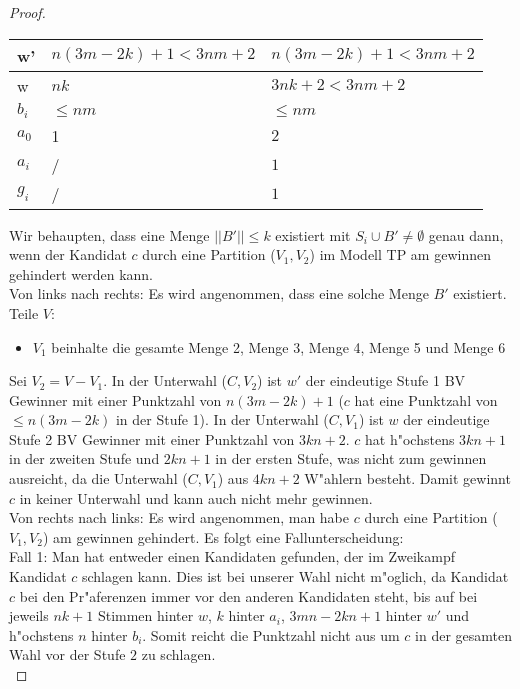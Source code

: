 \documentclass[11pt, a4paper, twoside]{article}
\begin{document}
\begin{proof}
\begin{minipage}{\textwidth}{}
\begin{tabular}{|lll|}
\hline
w'&$n(3m-2k)+1<3nm+2$& $n(3m-2k)+1<3nm+2$\\
\hline
w&$nk$&$3nk+2<3nm+2$\\
\hline
$b_i$&$\leq nm$&$\leq nm$\\
\hline
$a_0$&1& $2$\\
\hline
$a_i$&/& $1$\\
\hline
$g_i$&/& $1$\\
\hline
\end{tabular}
\end{minipage}
\newline
\newline
Wir behaupten, dass eine Menge $||B'|| \leq k$ existiert mit $S_i \cup B' \not= \emptyset$  genau dann, wenn der Kandidat $c$ durch eine Partition ($V_1,V_2$) im Modell TP am gewinnen gehindert werden kann.\\
Von links nach rechts: Es wird angenommen, dass eine solche Menge $B'$ existiert. Teile $V$:
\begin{itemize}
\item $V_1$ beinhalte die gesamte Menge 2, Menge 3, Menge 4, Menge 5 und Menge 6 
\end{itemize}
Sei $V_2=V-V_1$. In der Unterwahl ($C,V_2$) ist $w'$ der eindeutige Stufe 1 BV Gewinner mit einer Punktzahl von $n(3m-2k)+1$ ($c$ hat eine Punktzahl von $\leq n(3m-2k)$ in der Stufe 1). In der Unterwahl ($C,V_1$) ist $w$ der eindeutige Stufe 2 BV Gewinner mit einer Punktzahl von $3kn+2$. $c$ hat h"ochstens $3kn+1$ in der zweiten Stufe und $2kn+1$ in der ersten Stufe, was nicht zum gewinnen ausreicht, da die Unterwahl ($C,V_1$) aus $4kn+2$ W"ahlern besteht. Damit gewinnt $c$ in keiner Unterwahl und kann auch nicht mehr gewinnen.\\
Von rechts nach links: Es wird angenommen, man habe $c$ durch eine Partition ($V_1,V_2$) am gewinnen gehindert. Es folgt eine Fallunterscheidung:\\
Fall 1: Man hat entweder einen Kandidaten gefunden, der im Zweikampf Kandidat $c$ schlagen kann. Dies ist bei unserer Wahl nicht m"oglich, da Kandidat $c$ bei den Pr"aferenzen immer vor den anderen Kandidaten steht, bis auf bei jeweils $nk+1$ Stimmen hinter $w$, $k$ hinter $a_i$, $3mn -2kn+1$ hinter $w'$ und h"ochstens $n$ hinter $b_i$. Somit reicht die Punktzahl nicht aus um $c$ in der gesamten Wahl vor der Stufe $2$ zu schlagen.\\

\end{proof}
\end{document}
